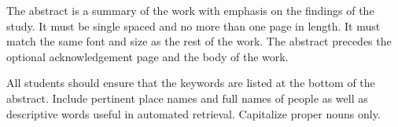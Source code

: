 The abstract is a summary of the work with emphasis on the findings of the study. It must be single spaced and no more than one page in length. It must match the same font and size as the rest of the work. The abstract precedes the optional acknowledgement page and the body of the work.

All students should ensure that the keywords are listed at the bottom of the abstract. Include pertinent place names and full names of people as well as descriptive words useful in automated retrieval. Capitalize proper nouns only.
